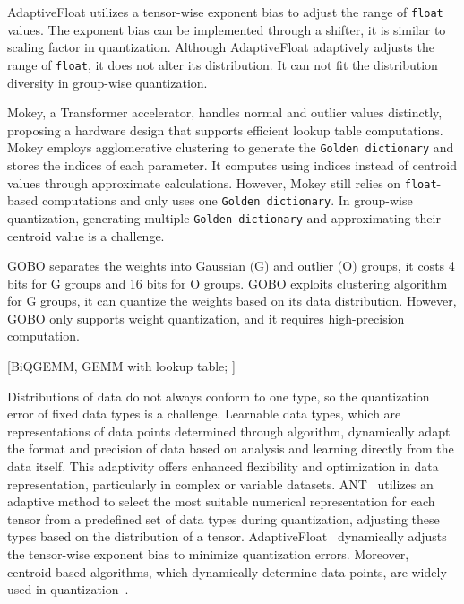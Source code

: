 AdaptiveFloat utilizes a tensor-wise exponent bias to adjust the range of \texttt{float} values.
The exponent bias can be implemented through a shifter, it is similar to scaling factor in quantization.
Although AdaptiveFloat adaptively adjusts the range of \texttt{float}, it does not alter its distribution.
It can not fit the distribution diversity in group-wise quantization.

Mokey, a Transformer accelerator, handles normal and outlier values distinctly, proposing a hardware design that supports efficient lookup table computations.
Mokey employs agglomerative clustering to generate the \texttt{Golden dictionary} and stores the indices of each parameter.
It computes using indices instead of centroid values through approximate calculations.
However, Mokey still relies on \texttt{float}-based computations and only uses one \texttt{Golden dictionary}.
In group-wise quantization, generating multiple \texttt{Golden dictionary} and approximating their centroid value is a challenge.

GOBO separates the weights into Gaussian (G) and outlier (O) groups, it costs 4 bits for G groups and 16 bits for O groups.
GOBO exploits clustering algorithm for G groups, it can quantize the weights based on its data distribution.
However, GOBO only supports weight quantization, and it requires high-precision computation.

[BiQGEMM, GEMM with lookup table; ]

Distributions of data do not always conform to one type, so the quantization error of fixed data types is a challenge.
Learnable data types, which are representations of data points determined through algorithm, dynamically adapt the format and precision of data based on analysis and learning directly from the data itself. 
This adaptivity offers enhanced flexibility and optimization in data representation, particularly in complex or variable datasets.
ANT~\cite{guo2022ant} utilizes an adaptive method to select the most suitable numerical representation for each tensor from a predefined set of data types during quantization, adjusting these types based on the distribution of a tensor.
AdaptiveFloat~\cite{tambe2020algorithm} dynamically adjusts the tensor-wise exponent bias to minimize quantization errors.
Moreover, centroid-based algorithms, which dynamically determine data points, are widely used in quantization~\cite{han2015deep, zadeh2020gobo, lutnn2023, kim2023squeezellm, xu2018deep}.


